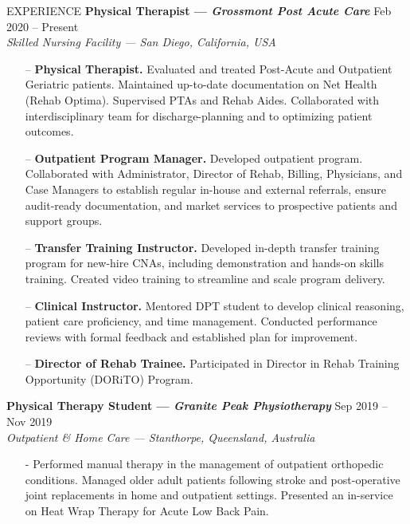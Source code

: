 \documentclass{resume} %
\begin{document}
\begin{rSection}{EXPERIENCE}
\textbf{Physical Therapist --- \textit{Grossmont Post Acute Care}} \hfill Feb 2020 -- Present\\
\textit{Skilled Nursing Facility --- San Diego, California, USA}
\vspace*{-0.2cm}\begin{itemize}
    \item[--] \textbf{Physical Therapist.} Evaluated and treated Post-Acute and Outpatient Geriatric patients. Maintained up-to-date documentation on Net Health (Rehab Optima). Supervised PTAs and Rehab Aides. Collaborated with interdisciplinary team for discharge-planning and to optimizing patient outcomes.
    \item[--] \textbf{Outpatient Program Manager.} Developed outpatient program. Collaborated with Administrator, Director of Rehab, Billing, Physicians, and Case Managers to establish regular in-house and external referrals, ensure audit-ready documentation, and market services to prospective patients and support groups.
    \item[--] \textbf{Transfer Training Instructor.} Developed in-depth transfer training program for new-hire CNAs, including demonstration and hands-on skills training. Created video training to streamline and scale program delivery.
    \item[--] \textbf{Clinical Instructor.} Mentored DPT student to develop clinical reasoning, patient care proficiency, and time management. Conducted performance reviews with formal feedback and established plan for improvement.
    \item[--] \textbf{Director of Rehab Trainee.} Participated in Director in Rehab Training Opportunity (DORiTO) Program.
\end{itemize}

\textbf{Physical Therapy Student --- \textit{Granite Peak Physiotherapy}} 
\hfill Sep 2019 -- Nov 2019\\
\textit{Outpatient \& Home Care --- Stanthorpe, Queensland, Australia}
\vspace*{-0.2cm}\begin{itemize}
    \item[-] Performed manual therapy in the management of outpatient orthopedic conditions. Managed older adult patients following stroke and post-operative joint replacements in home and outpatient settings. Presented an in-service on Heat Wrap Therapy for Acute Low Back Pain.
\end{itemize}


\end{rSection}
\end{document}
